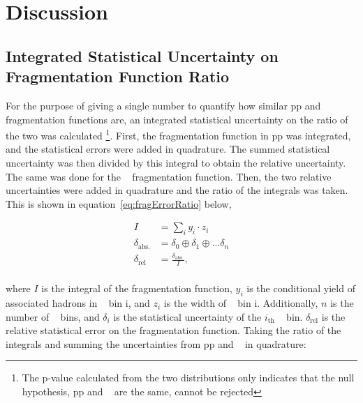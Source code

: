 





% 

\chapter{Discussion}

\section{Integrated Statistical Uncertainty on Fragmentation Function Ratio}
For the purpose of giving a single number to quantify how similar pp and \pPb~ fragmentation functions are, an integrated statistical uncertainty on the ratio of the two was calculated \footnote{The p-value calculated from the two distributions only indicates that the null hypothesis, pp and \pPb~ are the same, cannot be rejected}. First, the fragmentation function in pp was integrated, and the statistical errors were added in quadrature. The summed statistical uncertainty was then divided by this integral to obtain the relative uncertainty. The same was done for the \pPb~ fragmentation function. Then, the two relative uncertainties were added in quadrature and the ratio of the integrals was taken. This is shown in equation~\ref{eq:fragErrorRatio} below,

\begin{equation}\label{eq:fragErrorRatio}
  \begin{split}
    I &= \sum_i y_i\cdot z_i \\
    \delta_\mathrm{abs.} &= \delta_0 \oplus \delta_1 \oplus ...\delta_n\\
    \delta_\mathrm{rel} &= \frac{\delta_\mathrm{abs.}}{I},\\
  \end{split}
\end{equation}{}

where $I$ is the integral of the fragmentation function, $y_i$ is the conditional yield of associated hadrons in \zt~ bin i, and $z_i$ is the width of \zt~ bin i. Additionally, $n$ is the number of \zt~ bins, and $\delta_i$ is the statistical uncertainty of the $i_\mathrm{th}$ \zt~ bin. $\delta_\mathrm{rel}$ is the relative statistical error on the fragmentation function. Taking the ratio of the integrals and summing the uncertainties from pp and \pPb~ in quadrature:

